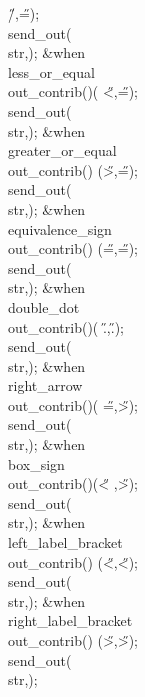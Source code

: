 \H{/}\?,\?\H{=}\?\2)\?;\5
\\{send\_out}\?\1(\?\\{str}\?,\?\2)\?;\6
\4\&{when}\8\\{less\_or\_equal}\KR\8\\{out\_contrib}\?\1(\?\to{}\?\2)\K\1(%
\?\H{<}\?,\?\H{=}\?\2)\?;\5
\\{send\_out}\?\1(\?\\{str}\?,\?\2)\?;\6
\4\&{when}\8\\{greater\_or\_equal}\KR\8\\{out\_contrib}\?\1(\?\to{}\?\2)\K%
\1(\?\H{>}\?,\?\H{=}\?\2)\?;\5
\\{send\_out}\?\1(\?\\{str}\?,\?\2)\?;\6
\4\&{when}\8\\{equivalence\_sign}\KR\8\\{out\_contrib}\?\1(\?\to{}\?\2)\K%
\1(\?\H{=}\?,\?\H{=}\?\2)\?;\5
\\{send\_out}\?\1(\?\\{str}\?,\?\2)\?;\6
\4\&{when}\8\\{double\_dot}\KR\8\\{out\_contrib}\?\1(\?\to{}\?\2)\K\1(\?%
\H{.}\?,\?\H{.}\?\2)\?;\5
\\{send\_out}\?\1(\?\\{str}\?,\?\2)\?;\6
\4\&{when}\8\\{right\_arrow}\KR\8\\{out\_contrib}\?\1(\?\to{}\?\2)\K\1(\?%
\H{=}\?,\?\H{>}\?\2)\?;\5
\\{send\_out}\?\1(\?\\{str}\?,\?\2)\?;\6
\4\&{when}\8\\{box\_sign}\KR\8\\{out\_contrib}\?\1(\?\to{}\?\2)\K\1(\?\H{<}%
\?,\?\H{>}\?\2)\?;\5
\\{send\_out}\?\1(\?\\{str}\?,\?\2)\?;\6
\4\&{when}\8\\{left\_label\_bracket}\KR\8\\{out\_contrib}\?\1(\?\to{}\?\2)%
\K\1(\?\H{<}\?,\?\H{<}\?\2)\?;\5
\\{send\_out}\?\1(\?\\{str}\?,\?\2)\?;\6
\4\&{when}\8\\{right\_label\_bracket}\KR\8\\{out\_contrib}\?\1(\?\to{}\?\2)%
\K\1(\?\H{>}\?,\?\H{>}\?\2)\?;\5
\\{send\_out}\?\1(\?\\{str}\?,\?\2)\?;\6
